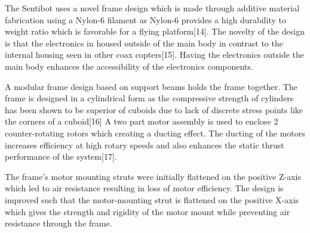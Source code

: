 \documentclass[12pt]{article}
\begin{document}
The Sentibot uses a novel frame design which is made through additive material fabrication using a Nylon-6 filament as Nylon-6 provides a high durability to weight ratio which is favorable for a flying platform[14]. The novelty of the design is that the electronics in housed outside of the main body in contrast to the internal housing seen in other coax copters[15]. Having the electronics outside the main body enhances the accessibility of the electronics components. 

A modular frame design based on support beams holds the frame together. The frame is designed in a cylindrical form as the compressive strength of cylinders has been shown to be superior of cuboids due to lack of discrete stress points like the corners of a cuboid[16] A two part motor assembly is used to enclose 2 counter-rotating rotors which creating a ducting effect. The ducting of the motors increases efficiency at high rotary speeds and also enhances the static thrust performance of the system[17].

The frame's motor mounting struts were initially flattened on the positive Z-axis which led to air resistance resulting in loss of motor efficiency. The design is improved such that the motor-mounting strut is flattened on the positive X-axis which gives the strength and rigidity of the motor mount while preventing air resistance through the frame.
\end{document}
